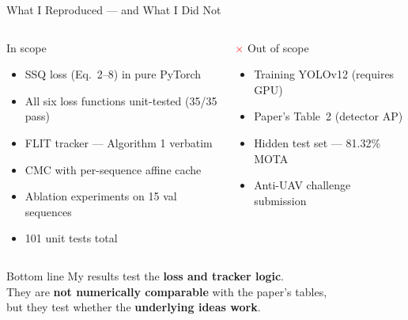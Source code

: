 \documentclass[aspectratio=169, 10pt]{beamer}
\newcommand{\yes}{\textcolor{green!60!black}{\textbf{\checkmark}}}
\newcommand{\no}{\textcolor{red}{\textbf{$\times$}}}
\newcommand{\red}[1]{\textcolor{honest}{#1}}
\begin{document}
\begin{frame}{What I Reproduced — and What I Did Not}

  \begin{columns}[T]

    \begin{block}{\yes\; In scope}
      \begin{itemize}
        \item SSQ loss (Eq.~2--8) in pure PyTorch
        \item All six loss functions unit-tested (35/35 pass)
        \item FLIT tracker — Algorithm 1 verbatim
        \item CMC with per-sequence affine cache
        \item Ablation experiments on 15 val sequences
        \item 101 unit tests total
      \end{itemize}
    \end{block}

    \begin{alertblock}{\no\; Out of scope}
      \begin{itemize}
        \item Training YOLOv12 \red{(requires GPU)}
        \item Paper's Table~2 (detector AP)
        \item Hidden test set — 81.32\% MOTA
        \item Anti-UAV challenge submission
      \end{itemize}
    \end{alertblock}

  \end{columns}

  \vspace{1em}
  \begin{block}{Bottom line}
    \centering
    My results test the \textbf{loss and tracker logic}.\\
    They are \textbf{not numerically comparable} with the paper's tables,\\
    but they test whether the \textbf{underlying ideas work}.
  \end{block}

\end{frame}

\end{document}
